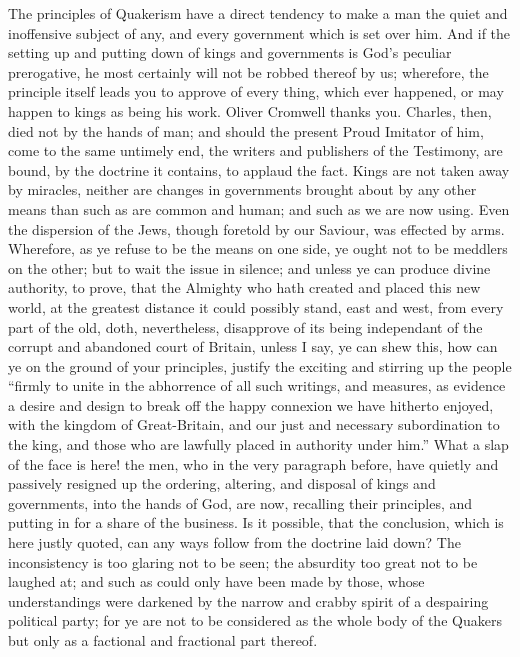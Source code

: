 \documentclass[12pt,oneside]{memoir}
\begin{document}
The principles of Quakerism have a direct tendency to make a man the
quiet and inoffensive subject of any, and every government which is
set over him. And if the setting up and putting down of kings and
governments is God's peculiar prerogative, he most certainly will
not be robbed thereof by us; wherefore, the principle itself leads
you to approve of every thing, which ever happened, or may happen to
kings as being his work. Oliver Cromwell thanks you. Charles, then,
died not by the hands of man; and should the present Proud Imitator
of him, come to the same untimely end, the writers and publishers of
the Testimony, are bound, by the doctrine it contains, to applaud
the fact. Kings are not taken away by miracles, neither are changes
in governments brought about by any other means than such as are
common and human; and such as we are now using. Even the dispersion
of the Jews, though foretold by our Saviour, was effected by arms.
Wherefore, as ye refuse to be the means on one side, ye ought not to
be meddlers on the other; but to wait the issue in silence; and
unless ye can produce divine authority, to prove, that the Almighty
who hath created and placed this new world, at the greatest distance
it could possibly stand, east and west, from every part of the old,
doth, nevertheless, disapprove of its being independant of the
corrupt and abandoned court of Britain, unless I say, ye can shew
this, how can ye on the ground of your principles, justify the
exciting and stirring up the people ``firmly to unite in the
abhorrence of all such writings, and measures, as evidence a desire
and design to break off the happy connexion we have hitherto enjoyed,
with the kingdom of Great-Britain, and our just and necessary
subordination to the king, and those who are lawfully placed in
authority under him.'' What a slap of the face is here! the men, who
in the very paragraph before, have quietly and passively resigned up
the ordering, altering, and disposal of kings and governments, into
the hands of God, are now, recalling their principles, and putting
in for a share of the business. Is it possible, that the conclusion,
which is here justly quoted, can any ways follow from the doctrine
laid down? The inconsistency is too glaring not to be seen; the
absurdity too great not to be laughed at; and such as could only
have been made by those, whose understandings were darkened by the
narrow and crabby spirit of a despairing political party; for ye are
not to be considered as the whole body of the Quakers but only as a
factional and fractional part thereof.
\end{document}
